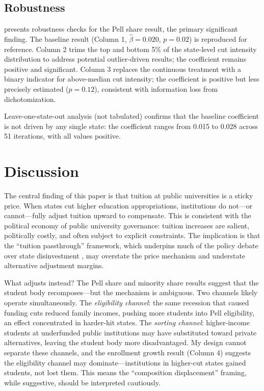 \documentclass[12pt]{article}
\begin{document}
\subsection{Robustness}



 presents robustness checks for the Pell share result, the primary significant finding. The baseline result (Column 1, $\hat{\beta} = 0.020$, $p = 0.02$) is reproduced for reference. Column 2 trims the top and bottom 5\% of the state-level cut intensity distribution to address potential outlier-driven results; the coefficient remains positive and significant. Column 3 replaces the continuous treatment with a binary indicator for above-median cut intensity; the coefficient is positive but less precisely estimated ($p = 0.12$), consistent with information loss from dichotomization.

Leave-one-state-out analysis (not tabulated) confirms that the baseline coefficient is not driven by any single state: the coefficient ranges from 0.015 to 0.028 across 51 iterations, with all values positive.

\section{Discussion}

The central finding of this paper is that tuition at public universities is a sticky price. When states cut higher education appropriations, institutions do not---or cannot---fully adjust tuition upward to compensate. This is consistent with the political economy of public university governance: tuition increases are salient, politically costly, and often subject to explicit constraints. The implication is that the ``tuition passthrough'' framework, which underpins much of the policy debate over state disinvestment \citep{bound2007cohort, webber2017state}, may overstate the price mechanism and understate alternative adjustment margins.

What adjusts instead? The Pell share and minority share results suggest that the student body recomposes---but the mechanism is ambiguous. Two channels likely operate simultaneously. The \textit{eligibility channel}: the same recession that caused funding cuts reduced family incomes, pushing more students into Pell eligibility, an effect concentrated in harder-hit states. The \textit{sorting channel}: higher-income students at underfunded public institutions may have substituted toward private alternatives, leaving the student body more disadvantaged. My design cannot separate these channels, and the enrollment growth result (Column 4) suggests the eligibility channel may dominate---institutions in higher-cut states gained students, not lost them. This means the ``composition displacement'' framing, while suggestive, should be interpreted cautiously.
\end{document}
